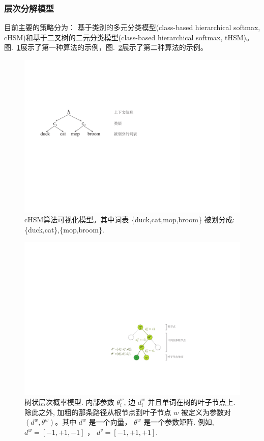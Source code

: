 \documentclass[twoside,UTF8,AutoFakeBold]{buaathesis}
\begin{document}
\subsubsection{层次分解模型}
目前主要的策略分为： 基于类别的多元分类模型(class-based hierarchical softmax, cHSM)和基于二叉树的二元分类模型(class-based hierarchical softmax, tHSM)。图.~\ref{fig:case_hsm}展示了第一种算法的示例，图.~\ref{fig:tree_hsm}展示了第二种算法的示例。
\begin{figure}
  \centering
\includegraphics[width=0.7\linewidth]{./figures/case_chsm}
\caption{cHSM算法可视化模型。其中词表 \{duck,cat,mop,broom\} 被划分成:\{duck,cat\},\{mop,broom\}.}\label{fig:case_hsm}
\end{figure}



\begin{figure}
  \centering
    \includegraphics[width=0.8\linewidth]{./figures/thsm}
\caption{树状层次概率模型. 内部参数 $\theta_i^w$, 边 $d_i^w$ 并且单词在树的叶子节点上. 除此之外, 加粗的那条路径从根节点到叶子节点 $w$ 被定义为参数对 $(d^w,\theta^w)$。其中 $d^w$ 是一个向量， $\theta^w$ 是一个参数矩阵. 例如, $d^w=[-1,+1,-1]$ ， $d^{v}=[-1,+1,+1]$.}\label{fig:tree_hsm} %
\end{figure}
\end{document}
